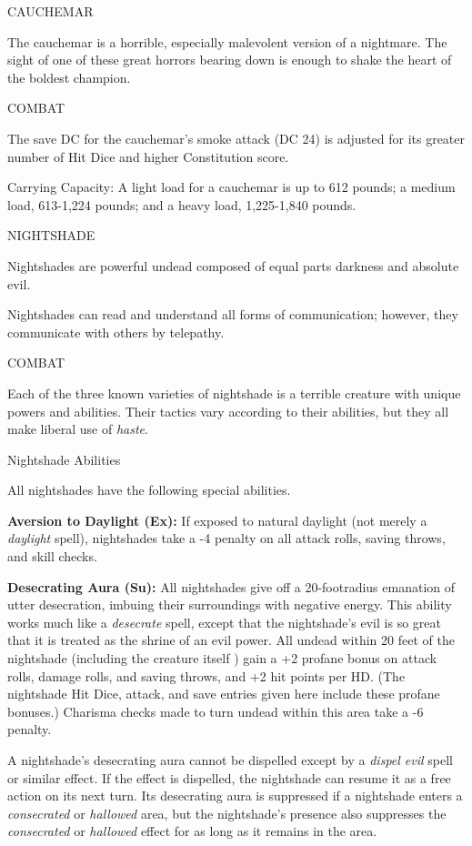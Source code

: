 \documentclass{article}
\begin{document}
\vspace{12pt}
CAUCHEMAR

The cauchemar is a horrible, especially malevolent version of a nightmare. The 
sight of one of these great horrors bearing down is enough to shake the heart of 
the boldest champion.

COMBAT

The save DC for the cauchemar's smoke attack (DC 24) is adjusted for its greater 
number of Hit Dice and higher Constitution score.

Carrying Capacity: A light load for a cauchemar is up to 612 pounds; a medium load, 
613-1,224 pounds; and a heavy load, 1,225-1,840 pounds.

\vspace{12pt}
{\LARGE{}NIGHTSHADE}

Nightshades are powerful undead composed of equal parts darkness and absolute evil.

Nightshades can read and understand all forms of communication; however, they communicate 
with others by telepathy.

COMBAT

Each of the three known varieties of nightshade is a terrible creature with unique 
powers and abilities. Their tactics vary according to their abilities, but they 
all make liberal use of \textit{haste}.

\vspace{12pt}
Nightshade Abilities

All nightshades have the following special abilities.

\textbf{Aversion to Daylight (Ex): }If exposed to natural daylight (not merely 
a \textit{daylight }spell), nightshades take a -4 penalty on all attack rolls, 
saving throws, and skill checks.

\textbf{Desecrating Aura (Su):} All nightshades give off a 20-footradius emanation 
of utter desecration, imbuing their surroundings with negative energy. This ability 
works much like a \textit{desecrate }spell, except that the nightshade's evil is 
so great that it is treated as the shrine of an evil power. All undead within 20 
feet of the nightshade (including the creature itself ) gain a +2 profane bonus 
on attack rolls, damage rolls, and saving throws, and +2 hit points per HD. (The 
nightshade Hit Dice, attack, and save entries given here include these profane 
bonuses.) Charisma checks made to turn undead within this area take a -6 penalty.

A nightshade's desecrating aura cannot be dispelled except by a \textit{dispel 
evil }spell or similar effect. If the effect is dispelled, the nightshade can resume 
it as a free action on its next turn. Its desecrating aura is suppressed if a nightshade 
enters a \textit{consecrated }or \textit{hallowed }area, but the nightshade's presence 
also suppresses the \textit{consecrated }or \textit{hallowed }effect for as long 
as it remains in the area.
\end{document}

